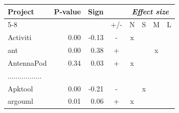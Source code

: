 \begin{tabular}{l r r c c c c c}
\toprule
\textbf{Project} & \textbf{P-value} & \textbf{Sign} &  & \multicolumn{4}{c}{\textit{\textbf{Effect size}}} \\
\cmidrule(l){5-8}
 & & & +/- & N & S & M & L \\
\midrule
Activiti & 0.00 & -0.13 & - & x &  &  &  \\
ant & 0.00 & 0.38 & + &  &  & x &  \\
AntennaPod & 0.34 & 0.03 & + & x &  &  &  \\
.................\\
Apktool & 0.00 & -0.21 & - &  & x &  &  \\
argouml & 0.01 & 0.06 & + & x &  &  &  \\
\bottomrule
\end{tabular}

